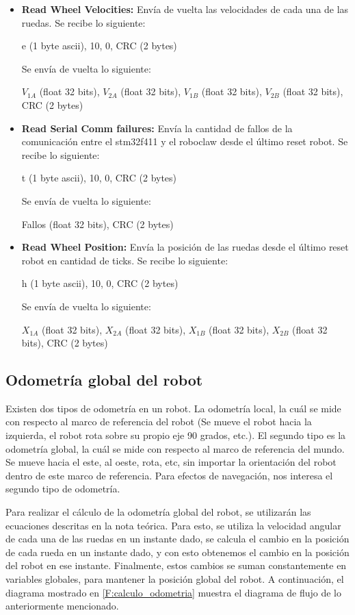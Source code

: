 \begin{itemize}
\item \textbf{Read Wheel Velocities:} Envía de vuelta las velocidades de cada una de las ruedas. Se recibe lo siguiente:

e (1 byte ascii), 10, 0, CRC (2 bytes)

Se envía de vuelta lo siguiente:

$V_{1A}$ (float 32 bits), $V_{2A}$ (float 32 bits), $V_{1B}$ (float 32 bits), $V_{2B}$ (float 32 bits), CRC (2 bytes)

\item \textbf{Read Serial Comm failures:} Envía la cantidad de fallos de la comunicación entre el stm32f411 y el roboclaw desde el último reset robot. Se recibe lo siguiente:

t (1 byte ascii), 10, 0, CRC (2 bytes)

Se envía de vuelta lo siguiente:

Fallos (float 32 bits), CRC (2 bytes)

\item \textbf{Read Wheel Position:} Envía la posición de las ruedas desde el último reset robot en cantidad de ticks. Se recibe lo siguiente:

h (1 byte ascii), 10, 0, CRC (2 bytes)

Se envía de vuelta lo siguiente:

$X_{1A}$ (float 32 bits), $X_{2A}$ (float 32 bits), $X_{1B}$ (float 32 bits), $X_{2B}$ (float 32 bits), CRC (2 bytes)

\end{itemize}

\subsection{Odometría global del robot}

Existen dos tipos de odometría en un robot. La odometría local, la cuál se mide con respecto al marco de referencia del robot (Se mueve el robot hacia la izquierda, el robot rota sobre su propio eje 90 grados, etc.). El segundo tipo es la odometría global, la cuál se mide con respecto al marco de referencia del mundo. Se mueve hacia el este, al oeste, rota, etc, sin importar la orientación del robot dentro de este marco de referencia. Para efectos de navegación, nos interesa el segundo tipo de odometría.

Para realizar el cálculo de la odometría global del robot, se utilizarán las ecuaciones descritas en la nota teórica. Para esto, se utiliza la velocidad angular de cada una de las ruedas en un instante dado, se calcula el cambio en la posición de cada rueda en un instante dado, y con esto obtenemos el cambio en la posición del robot en ese instante. Finalmente, estos cambios se suman constantemente en variables globales, para mantener la posición global del robot. A continuación, el diagrama mostrado en \ref{F:calculo_odometria} muestra el diagrama de flujo de lo anteriormente mencionado.

